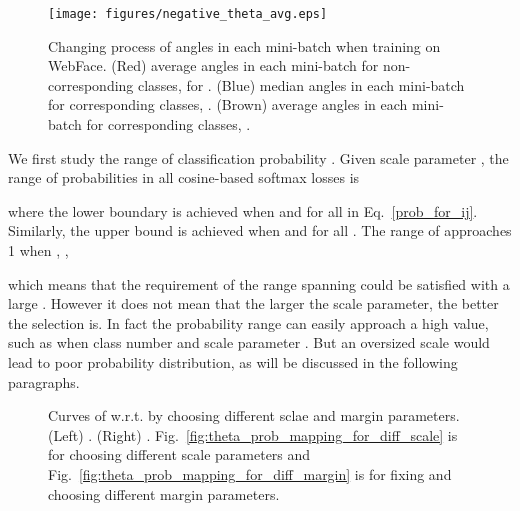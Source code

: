 \documentclass[10pt,twocolumn,letterpaper]{article}
\begin{document}
\begin{figure}[t]
\begin{center}
   \texttt{[image: figures/negative\_theta\_avg.eps]}
\end{center}
   \caption{ 
        Changing process of angles in each mini-batch when training on WebFace. (Red) average angles in each mini-batch for non-corresponding classes,  for . (Blue) median angles in each mini-batch for corresponding classes, . (Brown) average angles in each mini-batch for corresponding classes, .     }
\label{fig:negative_theat_avg}
\end{figure}

We first study the range of classification probability . Given scale parameter , the range of probabilities in all cosine-based softmax losses is

where the lower boundary is achieved when  and  for all  in Eq.~\eqref{prob_for_ij}. Similarly, the upper bound is achieved when  and  for all . The range of  approaches 1 when , \ie,

which means that the requirement of the range spanning  could be satisfied with a large . However it does not mean that the larger the scale parameter, the better the selection is. In fact the probability range can easily approach a high value, such as  when class number  and scale parameter . But an oversized scale would lead to poor probability distribution, as will be discussed in the following paragraphs.








\begin{figure*}
  \begin{center}
  
  \end{center}
\caption{ Curves of   w.r.t.  by choosing different sclae and margin parameters. (Left) . (Right) . Fig.~\ref{fig:theta_prob_mapping_for_diff_scale} is for choosing different scale parameters and Fig.~\ref{fig:theta_prob_mapping_for_diff_margin} is for fixing  and choosing different margin parameters.}
\label{fig:2d_features_on_s}
\end{figure*}
\end{document}
